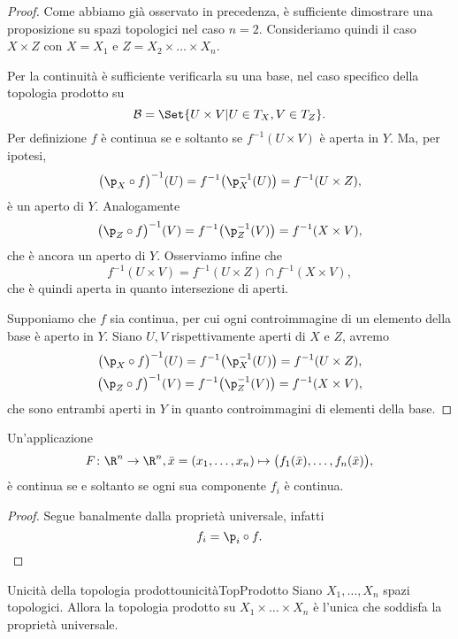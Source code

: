 \begin{proof}
	Come abbiamo già osservato in precedenza, è sufficiente dimostrare una proposizione su spazi topologici nel caso \(n=2\).
	Consideriamo quindi il caso \(X\times Z\) con \(X=X_1\) e \(Z=X_2 \times \ldots \times X_n\).

	Per la continuità è sufficiente verificarla su una base, nel caso specifico della topologia prodotto su
	\[
		\mathcal{B} = \Set{U\times V | U\in T_X, V\in T_Z}.
	\]
	\graffito{\(\Leftarrow)\)}Per definizione \(f\) è continua se e soltanto se \(f^{-1}(U\times V)\) è aperta in \(Y\).
	Ma, per ipotesi,
	\[
		\big( \p_X \circ f \big)^{-1}(U) = f^{-1}\big( \p_X^{-1}(U) \big) = f^{-1}(U\times Z),
	\]
	è un aperto di \(Y\).
	Analogamente
	\[
		\big( \p_Z \circ f \big)^{-1}(V) = f^{-1}\big( \p_Z^{-1}(V) \big) = f^{-1}(X\times V),
	\]
	che è ancora un aperto di \(Y\).
	Osserviamo infine che
	\[
		f^{-1}(U\times V) = f^{-1}(U\times Z) \cap f^{-1}(X\times V),
	\]
	che è quindi aperta in quanto intersezione di aperti.

	\graffito{\(\Rightarrow)\)}Supponiamo che \(f\) sia continua, per cui ogni controimmagine di un elemento della base è aperto in \(Y\).
	Siano \(U,V\) rispettivamente aperti di \(X\) e \(Z\), avremo
	\begin{gather*}
		\big( \p_X \circ f \big)^{-1}(U) = f^{-1}\big( \p_X^{-1}(U) \big) = f^{-1}(U\times Z),\\
		\big( \p_Z \circ f \big)^{-1}(V) = f^{-1}\big( \p_Z^{-1}(V) \big) = f^{-1}(X\times V),
	\end{gather*}
	che sono entrambi aperti in \(Y\) in quanto controimmagini di elementi della base.
\end{proof}

\begin{cor}
	Un'applicazione
	\[
		F\colon \R^n\to\R^n, \bar{x}=(x_1,\ldots,x_n) \mapsto \big( f_1(\bar{x}),\ldots,f_n(\bar{x}) \big),
	\]
	è continua se e soltanto se ogni sua componente \(f_i\) è continua.
\end{cor}

\begin{proof}
	Segue banalmente dalla proprietà universale, infatti
	\[
		f_i = \p_i \circ f.\qedhere
	\]
\end{proof}

\begin{prop}{Unicità della topologia prodotto}{unicitàTopProdotto}
	Siano \(X_1,\ldots,X_n\) spazi topologici.
	Allora la topologia prodotto su \(X_1\times \ldots \times X_n\) è l'unica che soddisfa la proprietà universale.
\end{prop}


